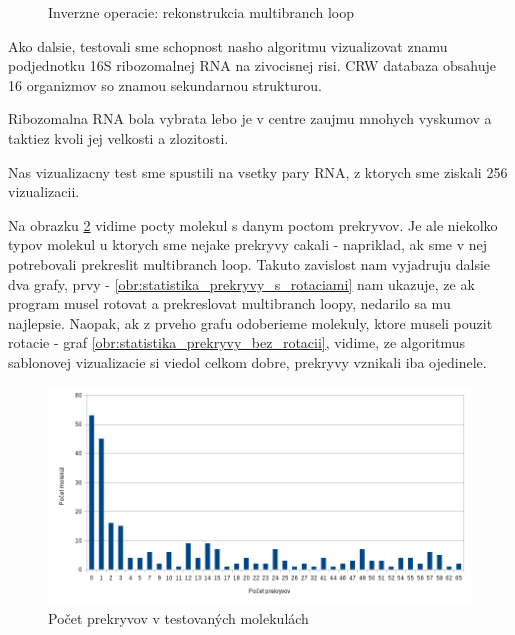 \begin{figure}[H]
\begin{subfigure}{0.3\textwidth}
  \end{subfigure}
  \caption{Inverzne operacie: rekonstrukcia multibranch loop}
  \label{obr:delete_insert_multibranch_loop}
\end{figure}

Ako dalsie, testovali sme schopnost nasho algoritmu vizualizovat znamu podjednotku 16S ribozomalnej RNA
na zivocisnej risi. CRW databaza obsahuje 16 organizmov so znamou sekundarnou strukturou.

Ribozomalna RNA bola vybrata lebo je v centre zaujmu mnohych vyskumov a taktiez kvoli jej velkosti
a zlozitosti.

Nas vizualizacny test sme spustili na vsetky pary RNA, z ktorych sme ziskali 256 vizualizacii.


Na obrazku \ref{obr:statistika_prekryvy} vidime pocty molekul s danym poctom prekryvov. 
Je ale niekolko typov molekul u ktorych sme nejake prekryvy cakali - napriklad, ak sme v nej
potrebovali prekreslit multibranch loop. Takuto zavislost nam vyjadruju dalsie dva grafy,
prvy - \ref{obr:statistika_prekryvy_s_rotaciami} nam ukazuje, ze ak program musel rotovat
a prekreslovat multibranch loopy, nedarilo sa mu najlepsie. Naopak, ak z prveho grafu
odoberieme molekuly, ktore museli pouzit rotacie - graf \ref{obr:statistika_prekryvy_bez_rotacii},
vidime, ze algoritmus sablonovej vizualizacie si viedol celkom dobre, prekryvy vznikali iba ojedinele.


\begin{figure}
  \includegraphics[width=1\textwidth]{../img/statistika/prekryvy-pocetmolekul}
  \caption{Počet prekryvov v testovaných molekulách}
  \label{obr:statistika_prekryvy}
\end{figure}



